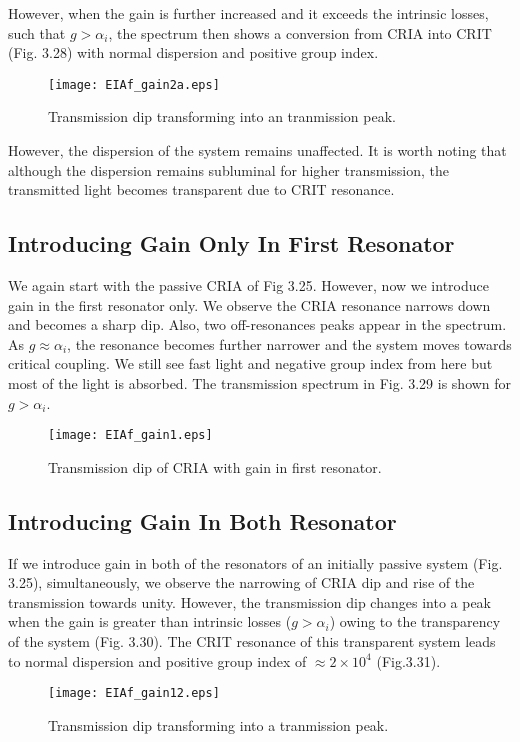 However, when the gain is further increased and it exceeds the intrinsic losses, such that $g > \alpha_{i}$, the spectrum then shows a conversion from CRIA into CRIT (Fig. 3.28) with normal dispersion and positive group index.

\begin{figure}[h]
\centering
\texttt{[image: EIAf\_gain2a.eps]}
\caption{Transmission dip transforming into an tranmission peak.}
\end{figure}

However, the dispersion of the system remains unaffected. It is worth noting that although the dispersion remains subluminal for higher transmission, the transmitted light becomes transparent due to CRIT resonance.

\subsection{Introducing Gain Only In First Resonator}
We again start with the passive CRIA of Fig 3.25. However, now we introduce gain in the first resonator only. We observe the CRIA resonance narrows down and becomes a sharp dip. Also, two off-resonances peaks appear in the spectrum. As $g \approx \alpha_{i}$, the resonance becomes further narrower and the system moves towards critical coupling. We still see fast light and negative group index from here but most of the light is absorbed. The transmission spectrum in Fig. 3.29 is shown for $g > \alpha_{i}$.

\begin{figure}[h]
\centering
\texttt{[image: EIAf\_gain1.eps]}
\caption{Transmission dip of CRIA with gain in first resonator.}
\end{figure}

\subsection{Introducing Gain In Both Resonator}
If we introduce gain in both of the resonators of an initially passive system (Fig. 3.25), simultaneously, we observe the narrowing of CRIA dip and rise of the transmission towards unity. However, the transmission dip changes into a peak when the gain is greater than intrinsic losses ($g > \alpha_{i}$) owing to the transparency of the system (Fig. 3.30). The CRIT resonance of this transparent system leads to normal dispersion and positive group index of $\approx 2\times10^{4}$ (Fig.3.31).

\begin{figure}[h]
\centering
\texttt{[image: EIAf\_gain12.eps]}
\caption{Transmission dip transforming into a tranmission peak.}
\end{figure}

